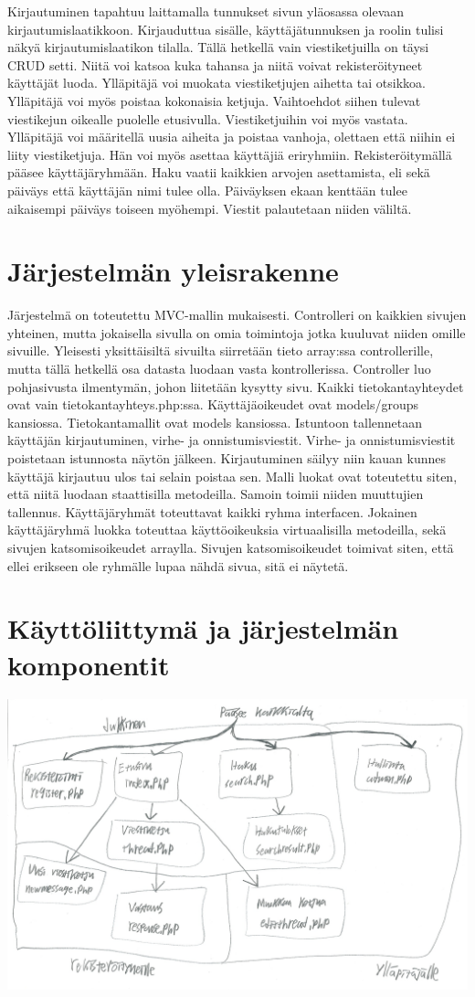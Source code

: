 \documentclass[a4paper, 12pt, finnish]{article}
\begin{document}
Kirjautuminen tapahtuu laittamalla tunnukset sivun yläosassa olevaan kirjautumislaatikkoon.
Kirjauduttua sisälle, käyttäjätunnuksen ja roolin tulisi näkyä kirjautumislaatikon tilalla.
Tällä hetkellä vain viestiketjuilla on täysi CRUD setti.
Niitä voi katsoa kuka tahansa ja niitä voivat rekisteröityneet käyttäjät luoda.
Ylläpitäjä voi muokata viestiketjujen aihetta tai otsikkoa.
Ylläpitäjä voi myös poistaa kokonaisia ketjuja.
Vaihtoehdot siihen tulevat viestikejun oikealle puolelle etusivulla.
Viestiketjuihin voi myös vastata.
Ylläpitäjä voi määritellä uusia aiheita ja poistaa vanhoja, olettaen että niihin ei liity viestiketjuja.
Hän voi myös asettaa käyttäjiä eriryhmiin.
Rekisteröitymällä pääsee käyttäjäryhmään.
Haku vaatii kaikkien arvojen asettamista, eli sekä päiväys että käyttäjän nimi tulee olla.
Päiväyksen ekaan kenttään tulee aikaisempi päiväys toiseen myöhempi.
Viestit palautetaan niiden väliltä.

\newpage

\section{Järjestelmän yleisrakenne}
Järjestelmä on toteutettu MVC-mallin mukaisesti.
Controlleri on kaikkien sivujen yhteinen, mutta jokaisella sivulla on omia toimintoja jotka kuuluvat niiden omille sivuille.
Yleisesti yksittäisiltä sivuilta siirretään tieto array:ssa controllerille, mutta tällä hetkellä osa datasta luodaan vasta kontrollerissa.
Controller luo pohjasivusta ilmentymän, johon liitetään kysytty sivu.
Kaikki tietokantayhteydet ovat vain tietokantayhteys.php:ssa.
Käyttäjäoikeudet ovat models/groups kansiossa.
Tietokantamallit ovat models kansiossa.
Istuntoon tallennetaan käyttäjän kirjautuminen, virhe- ja onnistumisviestit.
Virhe- ja onnistumisviestit poistetaan istunnosta näytön jälkeen.
Kirjautuminen säilyy niin kauan kunnes käyttäjä kirjautuu ulos tai selain poistaa sen.
Malli luokat ovat toteutettu siten, että niitä luodaan staattisilla metodeilla.
Samoin toimii niiden muuttujien tallennus.
Käyttäjäryhmät toteuttavat kaikki ryhma interfacen.
Jokainen käyttäjäryhmä luokka toteuttaa käyttöoikeuksia virtuaalisilla metodeilla, sekä sivujen katsomisoikeudet arraylla.
Sivujen katsomisoikeudet toimivat siten, että ellei erikseen ole ryhmälle lupaa nähdä sivua, sitä ei näytetä.

\newpage

\section{Käyttöliittymä ja järjestelmän komponentit}
\includegraphics[width=\textwidth,height=\textheight,keepaspectratio]{kayttoliittyma.png}
\end{document}
